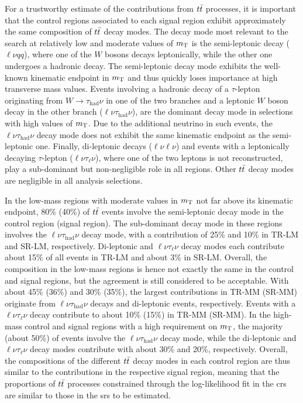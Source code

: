 For a trustworthy estimate of the contributions from $t\bar{t}$ processes, it is important that the control regions associated to each signal region exhibit approximately the same composition of $t\bar{t}$ decay modes.
The decay mode most relevant to the \onelepton search at relatively low and moderate values of $m_{\textrm{T}}$ is the semi-leptonic decay ($\ell\nu qq$), where one of the $W$ bosons decays leptonically, while the other one undergoes a hadronic decay.
The semi-leptonic decay mode exhibits the well-known kinematic endpoint in $m_{\textrm{T}}$ and thus quickly loses importance at high transverse mass values.
Events involving a hadronic decay of a $\tau$-lepton originating from $W\to\tau_\mathrm{had}\nu$ in one of the two branches and a leptonic $W$ boson decay in the other branch ($\ell\nu\tau_\mathrm{had}\nu$), are the dominant decay mode in selections with high values of $m_{\textrm{T}}$.
Due to the additional neutrino in such events, the $\ell\nu\tau_\mathrm{had}\nu$ decay mode does not exhibit the same kinematic endpoint as the semi-leptonic one.
Finally, di-leptonic decays ($\ell\nu\ell\nu$) and events with a leptonically decaying $\tau$-lepton ($\ell\nu\tau_\mathrm{\ell}\nu$), where one of the two leptons is not reconstructed, play a sub-dominant but non-negligible role in all regions.
Other $t\bar{t}$ decay modes are negligible in all analysis selections.

 In the low-mass regions with moderate values in $m_{\textrm{T}}$ not far above its kinematic endpoint, 80\% (40\%) of $t\bar{t}$ events involve the semi-leptonic decay mode in the control region (signal region).
 The sub-dominant decay mode in these regions involves the $\ell\nu\tau_\mathrm{had}\nu$ decay mode, with a contribution of 25\% and 10\% in TR-LM and SR-LM, respectively.
 Di-leptonic and $\ell\nu\tau_\mathrm{\ell}\nu$ decay modes each contribute about 15\% of all events in TR-LM and about 3\% in SR-LM.
 Overall, the composition in the low-mass regions is hence not exactly the same in the control and signal regions, but the agreement is still considered to be acceptable.
 With about 45\% (36\%) and 30\% (35\%), the largest contributions in TR-MM (SR-MM) originate from $\ell\nu\tau_\mathrm{had}\nu$ decays and di-leptonic events, respectively.
 Events with a $\ell\nu\tau_\mathrm{\ell}\nu$ decay contribute to about 10\% (15\%) in TR-MM (SR-MM). 
 In the high-mass control and signal regions with a high requirement on $m_{\textrm{T}}$, the majority (about 50\%) of events involve the $\ell\nu\tau_\mathrm{had}\nu$ decay mode, while the di-leptonic and $\ell\nu\tau_\mathrm{\ell}\nu$ decay modes contribute with about 30\% and 20\%, respectively.
 Overall, the compositions of the different $t\bar{t}$ decay modes in each control region are thus similar to the contributions in the respective signal region, meaning that the proportions of $t\bar{t}$ processes constrained through the log-likelihood fit in the \glspl{cr} are similar to those in the \glspl{sr} to be estimated.

